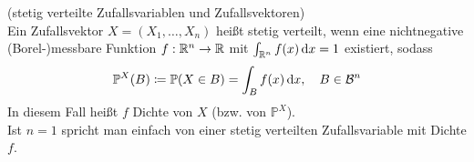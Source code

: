\begin{Definition}(stetig verteilte Zufallsvariablen und Zufallsvektoren)\\
	Ein Zufallsvektor $ X = (X_1,\dots,X_n) $ heißt stetig verteilt, wenn eine nichtnegative \\ (Borel-)messbare Funktion $ f : \mathbb{R}^n \to \mathbb{R} $ mit $ \int_{\mathbb{R}^n} f(x) \, \mathrm{d} x =1  $ existiert, sodass 
	\[
		\mathbb{P}^X(B) \coloneqq \mathbb{P}(X \in B) =  \int_{B} f(x) \, \mathrm{d} x, \quad B \in \mathcal{B}^n
	\]
	In diesem Fall heißt $ f $ Dichte von $ X $ (bzw. von $ \mathbb{P}^X $).\\
	Ist $ n=1 $ spricht man einfach von einer stetig verteilten Zufallsvariable mit Dichte $ f $.
	
\end{Definition}

